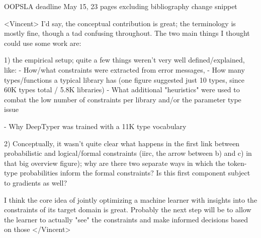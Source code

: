  OOPSLA deadline May 15, 23 pages excluding bibliography
change snippet

<Vincent>
I'd say, the conceptual contribution is great; the terminology is mostly
fine, though a tad confusing throughout. The two main things I thought could
use some work are:

1) the empirical setup; quite a few things weren't very well
defined/explained, like:
  - How/what constraints were extracted from error messages,
  - How many types/functions a typical library has (one figure suggested
just 10 types, since 60K types total / 5.8K libraries)
  - What additional "heuristics" were used to combat the low number of
constraints per library and/or the parameter type issue

  - Why DeepTyper was trained with a 11K type vocabulary
  
2) Conceptually, it wasn't quite clear what happens in the first link
between probabilistic and logical/formal constraints (iirc, the arrow
between b) and c) in that big overview figure); why are there two separate
ways in which the token-type probabilities inform the formal constraints? Is
this first component subject to gradients as well?

I think the core idea of jointly optimizing a machine learner with insights
into the constraints of its target domain is great. Probably the next step
will be to allow the learner to actually "see" the constraints and make
informed decisions based on those </Vincent>
